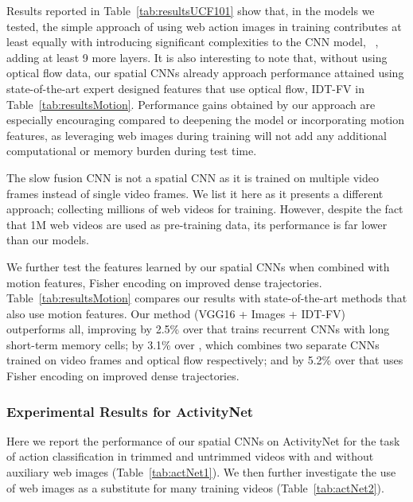 \documentclass[10pt,twocolumn,letterpaper]{article}
\begin{document}
Results reported in Table~\ref{tab:resultsUCF101} show that, in the models we tested, the simple approach of using web action images in training contributes at least equally with introducing significant complexities to the CNN model, \ie~, adding at least 9 more layers. It is also interesting to note that, without using optical flow data, our spatial CNNs already approach performance attained using state-of-the-art expert designed features that use optical flow, \ie IDT-FV \cite{wang2013lear} in Table~\ref{tab:resultsMotion}. Performance gains obtained by our approach are especially encouraging compared to deepening the model or incorporating motion features, as leveraging web images during training will not add any additional computational or memory burden during test time.

The slow fusion CNN \cite{KarpathyTSLSF14} is not a spatial CNN as it is trained on multiple video frames instead of single video frames. We list it here as it presents a different approach; collecting millions of web videos for training. However, despite the fact that 1M web videos are used as pre-training data, its performance is far lower than our models. 

We further test the features learned by our spatial CNNs when combined with motion features, \ie Fisher encoding on improved dense trajectories. Table~\ref{tab:resultsMotion} compares our results with state-of-the-art methods that also use motion features. Our method (VGG16 + Images + IDT-FV) outperforms all, improving by 2.5\% over \cite{ng2015beyond} that trains recurrent CNNs with long short-term memory cells; by 3.1\% over \cite{simonyan2014two}, which combines two separate CNNs trained on video frames and optical flow respectively; and by 5.2\% over \cite{wang2013lear} that uses Fisher encoding on improved dense trajectories. 


\subsubsection{Experimental Results for ActivityNet}
Here we report the performance of our spatial CNNs on ActivityNet for the task of action classification in trimmed and untrimmed videos with and without auxiliary web images (Table~\ref{tab:actNet1}). We then further investigate the use of web images as a substitute for many training videos (Table~\ref{tab:actNet2}).
\end{document}
